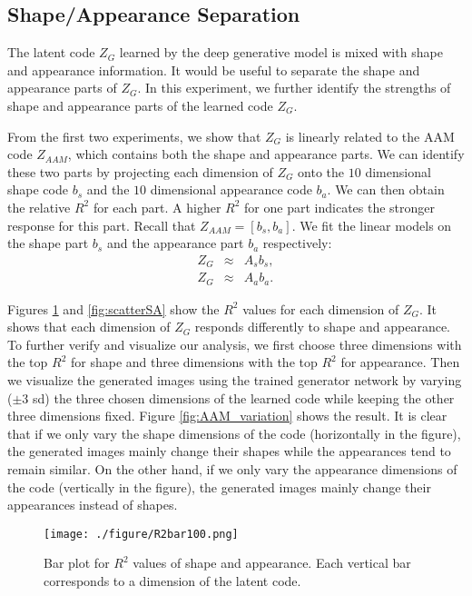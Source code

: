 \documentclass{article}
\begin{document}
\subsection{Shape/Appearance Separation}
The  latent code $Z_{G}$ learned by the deep generative model is  mixed with shape and appearance information.  It would be useful to separate the shape and appearance parts of $Z_{G}$. In this experiment, we further identify the strengths of shape and appearance parts of the learned code $Z_{G}$.

From the first two experiments, we show that $Z_{G}$ is linearly related to the AAM code $Z_{AAM}$, which contains both the shape and appearance parts. We can identify these two parts by projecting each dimension of $Z_{G}$ onto the $10$ dimensional shape code $b_s$ and the $10$ dimensional appearance code $b_a$. We can then obtain the relative $R^2$ for each part. A higher $R^2$ for one part indicates the stronger response for this part. Recall that $Z_{AAM} = [b_s, b_a]$. We fit the linear models on the shape part $b_s$ and the appearance part  $b_a$ respectively:
\begin{eqnarray}
Z_{G} &\approx& A_{s}  b_s, \\
Z_{G} &\approx& A_{a}  b_a.
\end{eqnarray}

Figures \ref{fig:barSA} and \ref{fig:scatterSA} show the $R^2$ values for each dimension of $Z_{G}$. It shows that each dimension of $Z_G$ responds differently to shape and appearance. To further verify and visualize our analysis, we first choose three dimensions with the top $R^2$ for shape  and three dimensions with the top $R^2$ for appearance. Then we visualize the generated images using the trained generator network by varying ($\pm 3$ sd) the three chosen dimensions of the learned code while keeping the other three dimensions fixed. Figure \ref{fig:AAM_variation} shows the result. It is clear that if we only vary the shape dimensions of the code (horizontally in the figure), the generated images mainly change their shapes while the appearances tend to remain similar. On the other hand, if we only vary the appearance dimensions of the code (vertically in the figure), the generated images mainly change their appearances instead of shapes.
\begin{figure}[h]
	\begin{center}
		\texttt{[image: ./figure/R2bar100.png]}%
		\caption{Bar plot for $R^2$ values of shape and appearance. Each vertical bar corresponds to a dimension of the latent code. }
		\label{fig:barSA}
	\end{center}
\end{figure}
\end{document}

